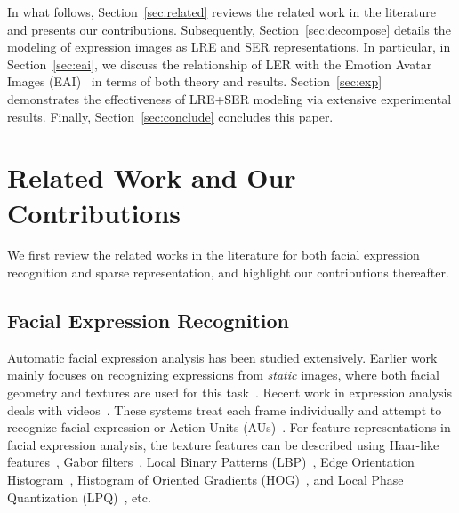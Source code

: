 \documentclass[journal]{IEEEtran}
\begin{document}
In what follows, Section~\ref{sec:related} reviews the related work in the literature and presents our contributions. Subsequently, Section~\ref{sec:decompose} details the modeling of expression images as LRE and SER representations. In particular, in Section~\ref{sec:eai}, we discuss the relationship of LER with the Emotion Avatar Images (EAI)~\cite{Yang_SMCB12} in terms of both theory and results. Section~\ref{sec:exp} demonstrates the effectiveness of LRE+SER modeling via extensive experimental results. Finally, Section~\ref{sec:conclude} concludes this paper.


\section{Related Work and Our Contributions\label{sec:related}}

We first review the related works in the literature for both facial expression recognition and sparse representation, and highlight our contributions thereafter. 

\subsection{Facial Expression Recognition}

Automatic facial expression analysis has been studied extensively. Earlier work mainly focuses on recognizing expressions from \textit{static} images, where both facial geometry and textures are used for this task~\cite{Pantic_PAMI00,Essa_PAMI97,Donato_PAMI99}. Recent work in expression analysis deals with videos~\cite{Bartlett_FG11,Kaliouby_SMC04,Valstar_FERA11}. These systems treat each frame individually and attempt to recognize facial expression or Action Units (AUs)~\cite{Ekman78}. For feature representations in facial expression analysis, the texture features can be described using Haar-like features~\cite{Whitehill_FG06}, Gabor filters~\cite{Lyons_PAMI99,Bartlett_FG11}, Local Binary Patterns (LBP)~\cite{Shan_IVC09,Jiang_FG11}, Edge Orientation Histogram~\cite{Levi_CVPR04}, Histogram of Oriented Gradients (HOG)~\cite{Dalal_CVPR05,Dhall_FERA11,Dahmane_FERA11}, and Local Phase Quantization (LPQ)~\cite{LPQ}, etc.
\end{document}
